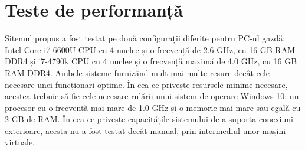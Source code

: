  \section{Teste de performanță}

Sitemul propus a fost testat pe două configurații diferite pentru PC-ul gazdă: Intel Core i7-6600U CPU cu 4 nuclee și o frecvență de 2.6 GHz, cu 16 GB RAM DDR4 și i7-4790k CPU cu 4 nuclee și o frecvență maximă de 4.0 GHz, cu 16 GB RAM DDR4. Ambele sisteme furnizând mult mai multe resure decât cele necesare unei funcționari optime. În cea ce privește resursele minime necesare, acestea trebuie să fie cele necesare rulării unui sistem de operare Windows 10: un procesor cu o frecvență mai mare de 1.0 GHz și o memorie mai mare sau egală cu 2 GB de RAM. În cea ce privește capacitățile sistemului de a suporta conexiuni exterioare, acesta nu a fost testat decât manual, prin intermediul unor mașini virtuale. 